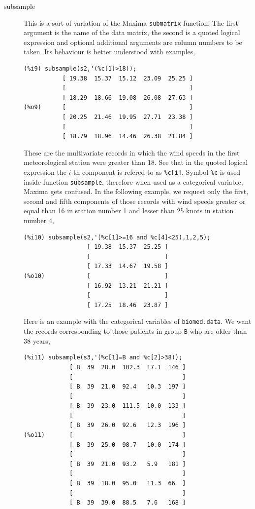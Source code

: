 \documentclass[12pt,a4paper]{article}
\begin{document}
\begin{description}
\item[subsample] This is a sort of variation of the Maxima \verb|submatrix| function. The first argument is the name of the data matrix, the second is a quoted logical expression and optional additional arguments are column numbers to be taken. Its behaviour is better understood with examples,
\begin{verbatim}
(%i9) subsample(s2,'(%c[1]>18));
           [ 19.38  15.37  15.12  23.09  25.25 ]
           [                                   ]
           [ 18.29  18.66  19.08  26.08  27.63 ]
(%o9)      [                                   ]
           [ 20.25  21.46  19.95  27.71  23.38 ]
           [                                   ]
           [ 18.79  18.96  14.46  26.38  21.84 ]
\end{verbatim}
These are the multivariate records in which the wind speeds in the first meteorological station were greater than 18. See that in the quoted logical expression the $i$-th component is refered to as \verb|%c[i]|. Symbol \verb|%c| is used inside function \verb|subsample|, therefore when used as a categorical variable, Maxima gets confused. In the following example, we request only the first, second and fifth components of those records with wind speeds greater or equal than 16 in station number 1 and lesser than 25 knots in station number 4,
\begin{verbatim}
(%i10) subsample(s2,'(%c[1]>=16 and %c[4]<25),1,2,5);
                  [ 19.38  15.37  25.25 ]
                  [                     ]
                  [ 17.33  14.67  19.58 ]
(%o10)            [                     ]
                  [ 16.92  13.21  21.21 ]
                  [                     ]
                  [ 17.25  18.46  23.87 ]
\end{verbatim}

Here is an example with the categorical variables of \verb|biomed.data|. We want the records corresponding to those patients in group \verb|B| who are older than 38 years,
\begin{verbatim}
(%i11) subsample(s3,'(%c[1]=B and %c[2]>38));
             [ B  39  28.0  102.3  17.1  146 ]
             [                               ]
             [ B  39  21.0  92.4   10.3  197 ]
             [                               ]
             [ B  39  23.0  111.5  10.0  133 ]
             [                               ]
             [ B  39  26.0  92.6   12.3  196 ]
(%o11)       [                               ]
             [ B  39  25.0  98.7   10.0  174 ]
             [                               ]
             [ B  39  21.0  93.2   5.9   181 ]
             [                               ]
             [ B  39  18.0  95.0   11.3  66  ]
             [                               ]
             [ B  39  39.0  88.5   7.6   168 ]
\end{verbatim}



\end{description}
\end{document}
